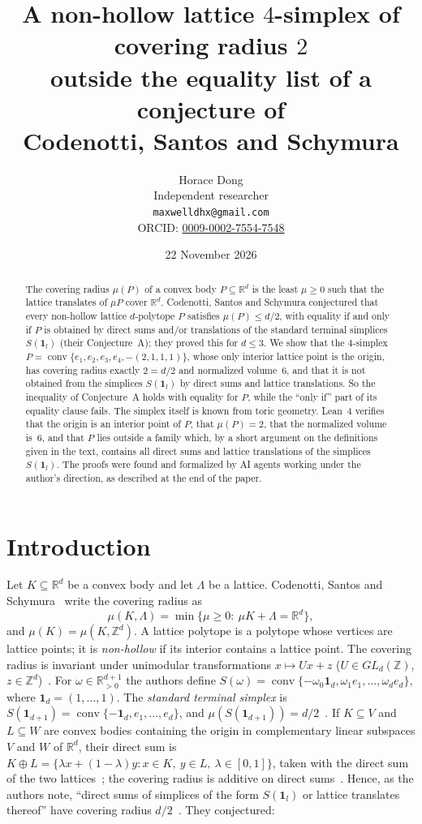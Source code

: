 \documentclass[11pt]{article}
\title{A non-hollow lattice $4$-simplex of covering radius $2$\\ outside the
equality list of a conjecture of\\ Codenotti, Santos and Schymura}
\author{Horace Dong\\ \small Independent researcher\\
\small\texttt{maxwelldhx@gmail.com}\\
\small ORCID: \href{https://orcid.org/0009-0002-7554-7548}{0009-0002-7554-7548}}
\date{22 November 2026}
\theoremstyle{definition}
\theoremstyle{remark}
\newcommand{\R}{\mathbb R}
\newcommand{\Z}{\mathbb Z}
\newcommand{\one}{\mathbf 1}
\newcommand{\conv}{\operatorname{conv}}
\begin{document}
\maketitle

\begin{abstract}
The covering radius $\mu(P)$ of a convex body $P\subseteq\R^d$ is the least
$\mu\ge0$ such that the lattice translates of $\mu P$ cover $\R^d$. Codenotti,
Santos and Schymura conjectured that every non-hollow lattice $d$-polytope $P$
satisfies $\mu(P)\le d/2$, with equality if and only if $P$ is obtained by
direct sums and/or translations of the standard terminal simplices
$S(\one_l)$ (their Conjecture~A); they proved this for $d\le3$. We show that
the $4$-simplex $P=\conv\{e_1,e_2,e_3,e_4,-(2,1,1,1)\}$, whose only interior
lattice point is the origin, has covering radius exactly $2=d/2$ and
normalized volume~$6$, and that it is not obtained from the simplices
$S(\one_l)$ by direct sums and lattice translations. So the inequality of
Conjecture~A holds with equality for $P$, while the ``only if'' part of its
equality clause fails. The simplex itself is known from toric geometry.
Lean~4 verifies that the origin is an interior point of $P$, that
$\mu(P)=2$, that the normalized volume is~$6$, and that $P$ lies outside a
family which, by a short argument on the definitions given in the text,
contains all direct sums and lattice translations of the simplices
$S(\one_l)$. The proofs were found and formalized by AI agents working under
the author's direction, as described at the end of the paper.
\end{abstract}

\section{Introduction}

Let $K\subseteq\R^d$ be a convex body and let $\Lambda$ be a lattice. Codenotti,
Santos and Schymura~\cite{css} write the covering radius as
\[
\mu(K,\Lambda)=\min\{\mu\ge0:\ \mu K+\Lambda=\R^d\},
\]
and $\mu(K)=\mu(K,\Z^d)$. A lattice polytope is a polytope whose vertices are
lattice points; it is \emph{non-hollow} if its interior contains a lattice
point. The covering radius is invariant under unimodular transformations
$x\mapsto Ux+z$ ($U\in GL_d(\Z)$, $z\in\Z^d$)~\cite[p.~2]{css}. For
$\omega\in\R^{d+1}_{>0}$ the authors define
$S(\omega)=\conv\{-\omega_0\one_d,\omega_1e_1,\dots,\omega_de_d\}$, where
$\one_d=(1,\dots,1)$. The \emph{standard terminal simplex} is
$S(\one_{d+1})=\conv\{-\one_d,e_1,\dots,e_d\}$, and
$\mu(S(\one_{d+1}))=d/2$~\cite[Eq.~(1)]{css}. If $K\subseteq V$ and
$L\subseteq W$ are convex bodies containing the origin in complementary linear
subspaces $V$ and $W$ of $\R^d$, their direct sum is
$K\oplus L=\{\lambda x+(1-\lambda)y: x\in K,\ y\in L,\ \lambda\in[0,1]\}$,
taken with the direct sum of the two lattices~\cite[Section~2.1]{css}; the
covering radius is additive on direct sums~\cite[Corollary~2.2]{css}. Hence,
as the authors note, ``direct sums of simplices of the form $S(\one_l)$ or
lattice translates thereof'' have covering radius $d/2$~\cite[p.~2]{css}. They
conjectured:
\end{document}
